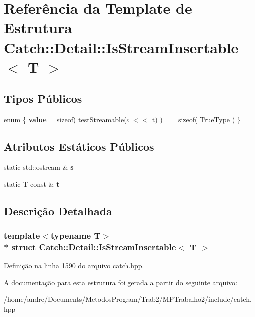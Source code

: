 \hypertarget{structCatch_1_1Detail_1_1IsStreamInsertable}{}\section{Referência da Template de Estrutura Catch\+:\+:Detail\+:\+:Is\+Stream\+Insertable$<$ T $>$}
\label{structCatch_1_1Detail_1_1IsStreamInsertable}
\subsection*{Tipos Públicos}
\begin{DoxyCompactItemize}
\item 
enum \{ {\bfseries value} = sizeof( test\+Streamable(s $<$$<$ t) ) == sizeof( True\+Type )
 \}\hypertarget{structCatch_1_1Detail_1_1IsStreamInsertable_a2e4508694da3bf368ff67733a7970edd}{}\label{structCatch_1_1Detail_1_1IsStreamInsertable_a2e4508694da3bf368ff67733a7970edd}

\end{DoxyCompactItemize}
\subsection*{Atributos Estáticos Públicos}
\begin{DoxyCompactItemize}
\item 
static std\+::ostream \& {\bfseries s}\hypertarget{structCatch_1_1Detail_1_1IsStreamInsertable_abe3d3c8e5d85665747faafffc9a96b00}{}\label{structCatch_1_1Detail_1_1IsStreamInsertable_abe3d3c8e5d85665747faafffc9a96b00}

\item 
static T const \& {\bfseries t}\hypertarget{structCatch_1_1Detail_1_1IsStreamInsertable_a7d2a3da978b6736667a7b2f6d51f507f}{}\label{structCatch_1_1Detail_1_1IsStreamInsertable_a7d2a3da978b6736667a7b2f6d51f507f}

\end{DoxyCompactItemize}


\subsection{Descrição Detalhada}
\subsubsection*{template$<$typename T$>$\\*
struct Catch\+::\+Detail\+::\+Is\+Stream\+Insertable$<$ T $>$}



Definição na linha 1590 do arquivo catch.\+hpp.



A documentação para esta estrutura foi gerada a partir do seguinte arquivo\+:\begin{DoxyCompactItemize}
\item 
/home/andre/\+Documents/\+Metodos\+Program/\+Trab2/\+M\+P\+Trabalho2/include/catch.\+hpp\end{DoxyCompactItemize}
